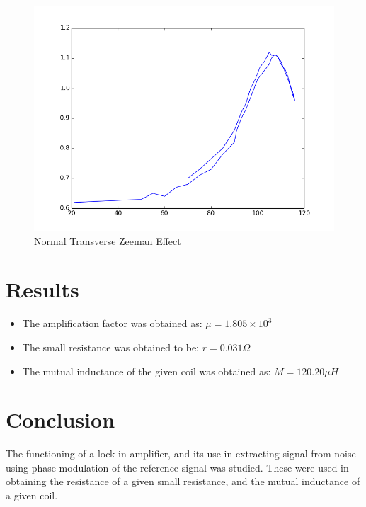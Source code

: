\documentclass[a4paper]{article}
\providecommand{\tightlist}{%
\setlength{\itemsep}{0pt}\setlength{\parskip}{0pt}}
\begin{document}
\begin{center} 
\begin{figure}[H] 
\begin{center}
\includegraphics[scale = 0.5]{graphs/03table1.png}
\caption{Normal Transverse Zeeman Effect} 
\end{center}
\end{figure}
\end{center}

\hypertarget{results}{%
\section{Results}\label{results}}

\begin{itemize}
\tightlist
\item
The amplification factor was obtained as: \(\mu = 1.805 \times 10^3\)
\item
The small resistance was obtained to be: \(r =0.031\Omega\)
\item
The mutual inductance of the given coil was obtained as:
\(M = 120.20 \mu H\)
\end{itemize}

\hypertarget{conclusion}{%
\section{Conclusion}\label{conclusion}}

The functioning of a lock-in amplifier, and its use in extracting signal
from noise using phase modulation of the reference signal was studied.
These were used in obtaining the resistance of a given small resistance,
and the mutual inductance of a given coil.
\end{document}
